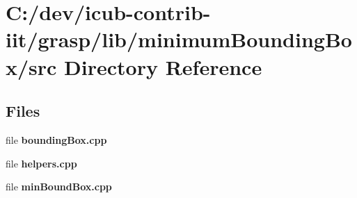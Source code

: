 \section{C\+:/dev/icub-\/contrib-\/iit/grasp/lib/minimum\+Bounding\+Box/src Directory Reference}
\label{dir_04d7bfefd4c58779af18d00cdc602db5}
\subsection*{Files}
\begin{DoxyCompactItemize}
\item 
file {\bfseries bounding\+Box.\+cpp}
\item 
file {\bfseries helpers.\+cpp}
\item 
file {\bfseries min\+Bound\+Box.\+cpp}
\end{DoxyCompactItemize}
